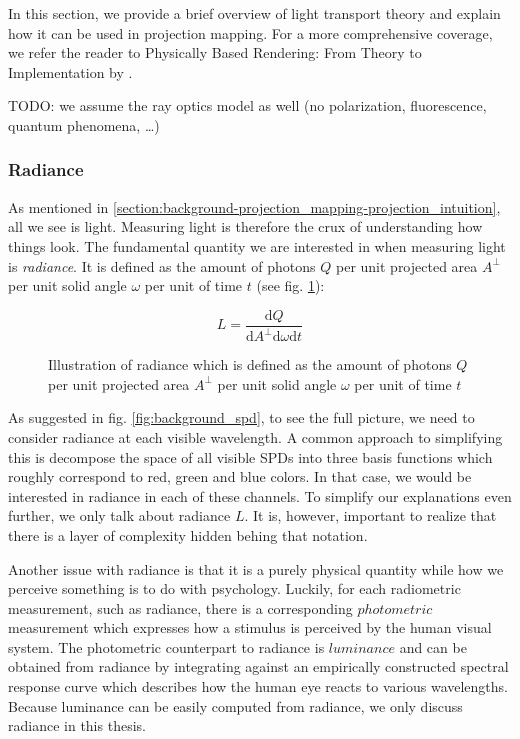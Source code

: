 In this section, we provide a brief overview of light transport theory and explain how it can be used in projection mapping. For a more comprehensive coverage, we refer the reader to Physically Based Rendering: From Theory to Implementation by \citet{PBRT3e}.

{\color{red} TODO: we assume the ray optics model as well (no polarization, fluorescence, quantum phenomena, \dots)}

\subsubsection{Radiance}
\label{section:background-projection_mapping-light_transport-radiance}

As mentioned in \ref{section:background-projection_mapping-projection_intuition}, all we see is light. Measuring light is therefore the crux of understanding how things look. The fundamental quantity we are interested in when measuring light is \textit{radiance}. It is defined as the amount of photons \(Q\) per unit projected area \(A^\perp \) per unit solid angle \(\omega\) per unit of time \(t\) (see fig. \ref{fig:background_radiance}):

\begin{equation}
    \label{eq:radiance}
    L = \frac{\mathrm{d}Q}{\mathrm{d}A^\perp \mathrm{d}\omega \mathrm{d}t}
\end{equation}

\begin{figure}[ht]
    \centering
    \def\svgwidth{0.8\textwidth}
    
    \caption{Illustration of radiance which is defined as the amount of photons \(Q\) per unit projected area \(A^\perp \) per unit solid angle \(\omega\) per unit of time \(t\)}
    \label{fig:background_radiance}
\end{figure}

As suggested in fig. \ref{fig:background_spd}, to see the full picture, we need to consider radiance at each visible wavelength. A common approach to simplifying this is decompose the space of all visible SPDs into three basis functions which roughly correspond to red, green and blue colors. In that case, we would be interested in radiance in each of these channels. To simplify our explanations even further, we only talk about radiance \(L\). It is, however, important to realize that there is a layer of complexity hidden behing that notation.

Another issue with radiance is that it is a purely physical quantity while how we perceive something is to do with psychology. Luckily, for each radiometric measurement, such as radiance, there is a corresponding \(photometric\) measurement which expresses how a stimulus is perceived by the human visual system. The photometric counterpart to radiance is \(luminance\) and can be obtained from radiance by integrating against an empirically constructed spectral response curve which describes how the human eye reacts to various wavelengths. Because luminance can be easily computed from radiance, we only discuss radiance in this thesis.

